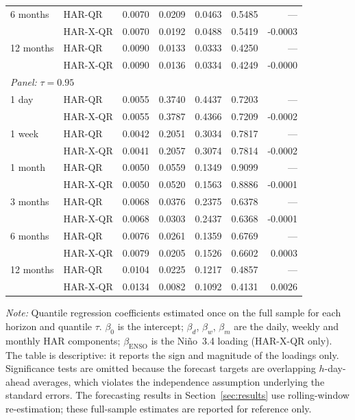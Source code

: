 \begin{table}[htbp]
\begin{tabular}{llrrrrr}
6 months & HAR-QR & 0.0070 & 0.0209 & 0.0463 & 0.5485 & --- \\
 & HAR-X-QR & 0.0070 & 0.0192 & 0.0488 & 0.5419 & -0.0003 \\
12 months & HAR-QR & 0.0090 & 0.0133 & 0.0333 & 0.4250 & --- \\
 & HAR-X-QR & 0.0090 & 0.0136 & 0.0334 & 0.4249 & -0.0000 \\
\midrule
\multicolumn{7}{l}{\textit{Panel: } $\tau = 0.95$} \\
\midrule
1 day & HAR-QR & 0.0055 & 0.3740 & 0.4437 & 0.7203 & --- \\
 & HAR-X-QR & 0.0055 & 0.3787 & 0.4366 & 0.7209 & -0.0002 \\
1 week & HAR-QR & 0.0042 & 0.2051 & 0.3034 & 0.7817 & --- \\
 & HAR-X-QR & 0.0041 & 0.2057 & 0.3074 & 0.7814 & -0.0002 \\
1 month & HAR-QR & 0.0050 & 0.0559 & 0.1349 & 0.9099 & --- \\
 & HAR-X-QR & 0.0050 & 0.0520 & 0.1563 & 0.8886 & -0.0001 \\
3 months & HAR-QR & 0.0068 & 0.0376 & 0.2375 & 0.6378 & --- \\
 & HAR-X-QR & 0.0068 & 0.0303 & 0.2437 & 0.6368 & -0.0001 \\
6 months & HAR-QR & 0.0076 & 0.0261 & 0.1359 & 0.6769 & --- \\
 & HAR-X-QR & 0.0079 & 0.0205 & 0.1526 & 0.6602 & 0.0003 \\
12 months & HAR-QR & 0.0104 & 0.0225 & 0.1217 & 0.4857 & --- \\
 & HAR-X-QR & 0.0134 & 0.0082 & 0.1092 & 0.4131 & 0.0026 \\
\bottomrule
\end{tabular}
\par\smallskip
{\footnotesize\textit{Note:} Quantile regression coefficients estimated once on the full sample for each horizon and quantile $\tau$. $\beta_0$ is the intercept; $\beta_d$, $\beta_w$, $\beta_m$ are the daily, weekly and monthly HAR components; $\beta_{\text{ENSO}}$ is the Ni\~no~3.4 loading (HAR-X-QR only). The table is descriptive: it reports the sign and magnitude of the loadings only. Significance tests are omitted because the forecast targets are overlapping $h$-day-ahead averages, which violates the independence assumption underlying the standard errors. The forecasting results in Section~\ref{sec:results} use rolling-window re-estimation; these full-sample estimates are reported for reference only.}
\end{table}
